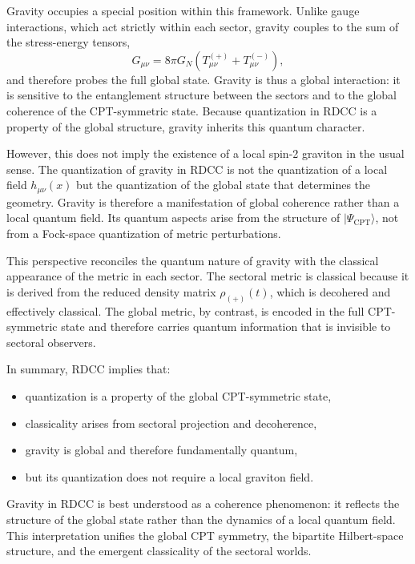 \documentclass[11pt,a4paper]{article}
\begin{document}
Gravity occupies a special position within this framework. Unlike gauge interactions, which act
strictly within each sector, gravity couples to the sum of the stress-energy tensors,
\begin{equation}
    G_{\mu\nu} = 8\pi G_N \left(T^{(+)}_{\mu\nu} + T^{(-)}_{\mu\nu}\right),
\end{equation}
and therefore probes the full global state. Gravity is thus a global interaction: it is sensitive to
the entanglement structure between the sectors and to the global coherence of the CPT-symmetric
state. Because quantization in RDCC is a property of the global structure, gravity inherits this
quantum character.

However, this does not imply the existence of a local spin-2 graviton in the usual sense. The
quantization of gravity in RDCC is not the quantization of a local field $h_{\mu\nu}(x)$ but the
quantization of the global state that determines the geometry. Gravity is therefore a manifestation
of global coherence rather than a local quantum field. Its quantum aspects arise from the
structure of $|\Psi_{\mathrm{CPT}}\rangle$, not from a Fock-space quantization of metric perturbations.

This perspective reconciles the quantum nature of gravity with the classical appearance of the
metric in each sector. The sectoral metric is classical because it is derived from the reduced
density matrix $\rho_{(+)}(t)$, which is decohered and effectively classical. The global metric,
by contrast, is encoded in the full CPT-symmetric state and therefore carries quantum
information that is invisible to sectoral observers.

In summary, RDCC implies that:
\begin{itemize}
    \item quantization is a property of the global CPT-symmetric state,
    \item classicality arises from sectoral projection and decoherence,
    \item gravity is global and therefore fundamentally quantum,
    \item but its quantization does not require a local graviton field.
\end{itemize}

Gravity in RDCC is best understood as a coherence phenomenon: it reflects the structure of the
global state rather than the dynamics of a local quantum field. This interpretation unifies the
global CPT symmetry, the bipartite Hilbert-space structure, and the emergent classicality of the
sectoral worlds.
\end{document}
